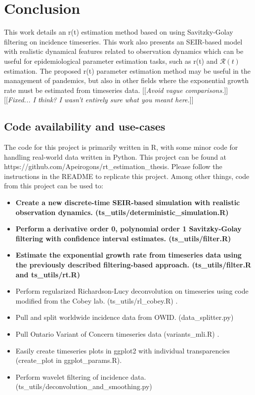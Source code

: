 \documentclass{article}
\newcommand{\nR}{\mathcal{R}}
\newcommand{\jd}[1]{[[\textsl{#1}]]} %
\newcommand{\msComment}[1]{[[\textsl{#1}]]}
\begin{document}
\section{Conclusion}
This work details an r(t) estimation method based on using Savitzky-Golay filtering on incidence timeseries. This work also presents an SEIR-based model with realistic dynamical features related to observation dynamics which can be useful for epidemiological parameter estimation tasks, such as r(t) and $\nR(t)$ estimation. The proposed r(t) parameter estimation method may be useful in the management of pandemics, but also in other fields where the exponential growth rate must be estimated from timeseries data. 
\jd{Avoid vague comparisons.} \msComment{Fixed... I think? I wasn't entirely sure what you meant here.}

\subsection{Code availability and use-cases}
The code for this project is primarily written in R, with some minor code for handling real-world data written in Python. This project can be found at https://github.com/Apeirogons/rt\_estimation\_thesis. Please follow the instructions in the README to replicate this project. Among other things, code from this project can be used to:

\begin{itemize}
	\item \textbf{Create a new discrete-time SEIR-based simulation with realistic observation dynamics. (ts\_utils/deterministic\_simulation.R)}
	\item \textbf{Perform a derivative order 0, polynomial order 1 Savitzky-Golay filtering with confidence interval estimates. (ts\_utils/filter.R)}
	\item \textbf{Estimate the exponential growth rate from timeseries data using the previously described filtering-based approach. (ts\_utils/filter.R and ts\_utils/rt.R)}
	\item Perform regularized Richardson-Lucy deconvolution on timeseries using code modified from the Cobey lab. (ts\_utils/rl\_cobey.R) \cite{Gostic}.
	\item Pull and split worldwide incidence data from OWID. (data\_splitter.py) \cite{OWID}
	\item Pull Ontario Variant of Concern timeseries data (variants\_mli.R) \cite{mli}.
	\item Easily create timeseries plots in ggplot2 with individual transparencies (create\_plot in ggplot\_params.R).
	\item Perform wavelet filtering of incidence data. (ts\_utils/deconvolution\_and\_smoothing.py)
\end{itemize}
\end{document}
